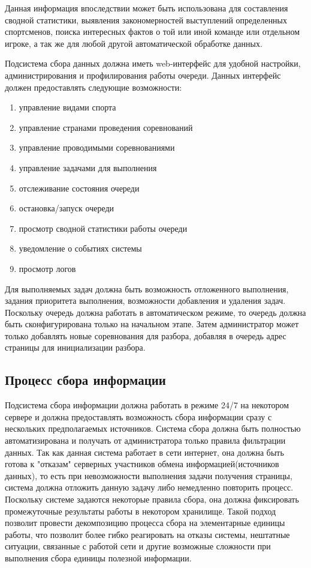 Данная информация впоследствии может быть использована для составления сводной статистики, выявления закономерностей выступлений определенных спортсменов, поиска интересных фактов о той или иной команде или отдельном игроке, а так же для любой другой автоматической обработке данных.

Подсистема сбора данных должна иметь web-интерфейс для удобной настройки, администрирования и профилирования работы очереди.
Данных интерфейс должен предоставлять следующие возможности:

\begin{enumerate}
  \item управление видами спорта
  \item управление странами проведения соревнований
  \item управление проводимыми соревнованиями 
  \item управление задачами для выполнения
  \item отслеживание состояния очереди
  \item остановка/запуск очереди
  \item просмотр сводной статистики работы очереди
  \item уведомление о событиях системы
  \item просмотр логов
\end{enumerate}

Для выполняемых задач должна быть возможность отложенного выполнения, задания приоритета выполнения, возможности добавления и удаления задач. Поскольку очередь должна работать в автоматическом режиме, то очередь должна быть сконфигурирована только на начальном этапе. Затем администратор может только добавлять новые соревнования для разбора, добавляя в очередь адрес страницы для инициализации разбора.

\subsection{Процесс сбора информации}

Подсистема сбора информации должна работать в режиме 24/7 на некотором сервере и должна предоставлять возможность сбора информации сразу с нескольких предполагаемых источников.
Система сбора должна быть полностью автоматизирована и получать от администратора только правила фильтрации данных. Так как данная система работает в сети интернет, она должна быть готова к "отказам" серверных участников обмена информацией(источников данных), то есть при невозможности выполнения задачи получения страницы, система должна отложить данную задачу либо немедленно повторить процесс. Поскольку системе задаются некоторые правила сбора, она должна фиксировать промежуточные результаты работы в некотором хранилище. Такой подход позволит провести декомпозицию процесса сбора на элементарные единицы работы, что позволит более гибко реагировать на отказы системы, нештатные ситуации, связанные с работой сети и другие возможные сложности при выполнения сбора единицы полезной информации.

